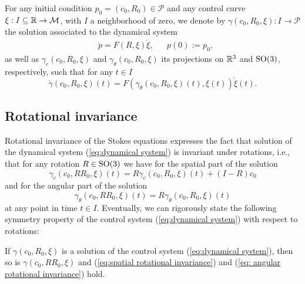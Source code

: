 \label{sec: symmetries}
For any initial condition $p_0 = (c_0, R_0) \in \mathcal{P}$ and any control curve $\xi: I \subseteq \mathbb{R} \to \mathcal{M}$, with $I$ a neighborhood of zero, we denote by $\gamma(c_0, R_0, \xi): I \to \mathcal{P}$ the solution associated to the dynamical system
\begin{equation}
\label{eq:dynamical system}
\begin{aligned}
	&\dot{p} = F(R, \xi) \dot{\xi},& & p(0) := p_0,
\end{aligned}
\end{equation}
as well as $\gamma_c(c_0, R_0, \xi)$ and $\gamma_\theta(c_0, R_0, \xi)$ its projections on $\mathbb{R}^3$ and $\operatorname{SO}(3)$, respectively, such that for any $t \in I$
\begin{equation}
	\dot{\gamma}(c_0, R_0, \xi)(t) = F(\gamma_\theta(c_0, R_0, \xi)(t), \xi(t))\dot{\xi}(t).
\end{equation}

\subsection{Rotational invariance}
Rotational invariance of the Stokes equations expresses the fact that solution of the dynamical system (\ref{eq:dynamical system}) is invariant under rotations, i.e., that for any rotation $R \in \operatorname{SO}(3)$ we have for the spatial part of the solution
\begin{equation}
\label{eq:spatial rotational invariance}
	\gamma_c(c_0, R R_0, \xi)(t) = R \gamma_c (c_0, R_0, \xi)(t) + (I - R) c_0
\end{equation}
and for the angular part of the solution
\begin{equation}
\label{eq: angular rotational invariance}
	\gamma_\theta(c_0, R R_0, \xi)(t) =  R \gamma_\theta(c_0, R_0, \xi)(t)
\end{equation}
at any point in time $t \in I$. Eventually, we can rigorously state the following symmetry property of the control system (\ref{eq:dynamical system}) with respect to rotations:

\begin{condition}
\label{cond:rotational invariance}
If $\gamma(c_0, R_0, \xi)$ is a solution of the control system (\ref{eq:dynamical system}), then so is $\gamma(c_0, R R_0, \xi)$ and (\ref{eq:spatial rotational invariance}) and (\ref{eq: angular rotational invariance}) hold.
\end{condition}

